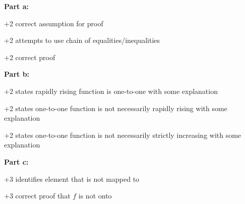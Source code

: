 \documentclass[12pt]{exam}
\begin{document}
\begin{solution}
\textbf{Part a:}
\begin{gwguidelines}
    \item +2 correct assumption for proof
    \item +2 attempts to use chain of equalities/inequalities
    \item +2 correct proof
\end{gwguidelines}
\textbf{Part b:}
\begin{gwguidelines}[resume]
    \item +2 states rapidly rising function is one-to-one with some explanation
    \item +2 states one-to-one function is not necessarily rapidly rising with some explanation
    \item +2 states one-to-one function is not necessarily strictly increasing with some explanation
\end{gwguidelines}
\textbf{Part c:}
\begin{gwguidelines}[resume]
    \item +3 identifies element that is not mapped to
    \item +3 correct proof that $f$ is not onto
\end{gwguidelines}
\end{solution}
\end{document}
